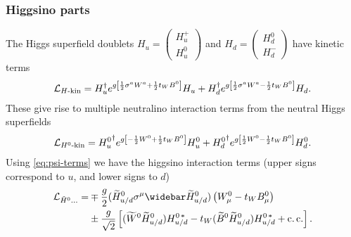 \documentclass[english, notitlepage]{article}
\begin{document}
        \subsubsection{Higgsino parts}
            The Higgs superfield doublets $H_u = \begin{pmatrix} H_u^+ \\ H_u^0 \end{pmatrix}$ and $H_d = \begin{pmatrix} H_d^0 \\ H_d^- \end{pmatrix}$ have kinetic terms
            \begin{align}
                \mathcal{L}_{H\text{-kin}} = H_u^\dag e^{g\left[\frac{1}{2}\sigma^a W^a + \frac{1}{2}t_W B^0\right]} H_u + H_d^\dag e^{g\left[\frac{1}{2}\sigma^a W^a - \frac{1}{2}t_WB^0\right]} H_d.
            \end{align}
            These give rise to multiple neutralino interaction terms from the neutral Higgs superfields
            \begin{align}
                \mathcal{L}_{H^0\text{-kin}} = {H_u^0}^\dag e^{g\left[-\frac{1}{2}W^0 + \frac{1}{2}t_W B^0\right]} H_u^0 + {H_d^0}^\dag e^{g\left[\frac{1}{2}W^0 - \frac{1}{2}t_W B^0\right]} H_d^0.
            \end{align}
            Using \cref{eq:psi-terms} we have the higgsino interaction terms (upper signs correspond to $u$, and lower signs to $d$)
            \begin{align} \nonumber
                \L_{\tilde{H}^0...} = & \mp \frac{g}{2} (\wtilde{H}^0_{u/d} \sigma^\mu \wbar{\wtilde{H}}^0_{u/d})\pclosed{W^0_\mu - t_W B^0_\mu}                                        \\
                                      & \pm \frac{g}{\sqrt{2}} \bclosed{(\wtilde{W}^0 \wtilde{H}^0_{u/d}) H^{0\,*}_{u/d} - t_W (\wtilde{B}^0 \wtilde{H}^0_{u/d}) H^{0\,*}_{u/d} + \cc}.
            \end{align}
\end{document}
